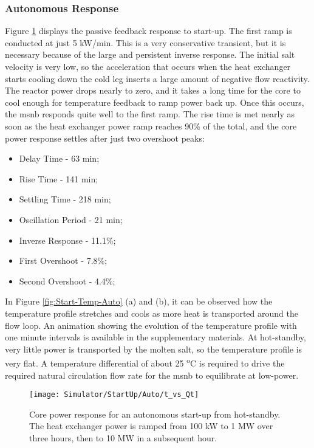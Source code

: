 \subsubsection{Autonomous Response}
Figure \ref{fig:Start-Power-Auto} displays the passive feedback response to start-up. The first ramp is conducted at just 5 kW/min. This is a very conservative transient, but it is necessary because of the large and persistent inverse response. The initial salt velocity is very low, so the acceleration that occurs when the heat exchanger starts cooling down the cold leg inserts a large amount of negative flow reactivity. The reactor power drops nearly to zero, and it takes a long time for the core to cool enough for temperature feedback to ramp power back up. Once this occurs, the \acs{msnb} responds quite well to the first ramp. The rise time is met nearly as soon as the heat exchanger power ramp reaches 90\% of the total, and the core power response settles after just two overshoot peaks:

\begin{itemize}
    \item Delay Time - 63 min;
    \item Rise Time - 141 min;
    \item Settling Time - 218 min;
    \item Oscillation Period - 21 min;
    \item Inverse Response - 11.1\%;
    \item First Overshoot - 7.8\%;
    \item Second Overshoot - 4.4\%;
\end{itemize}

In Figure \ref{fig:Start-Temp-Auto} (a) and (b), it can be observed how the temperature profile stretches and cools as more heat is transported around the flow loop. An animation showing the evolution of the temperature profile with one minute intervals is available in the supplementary materials\footnotemark[2]. At hot-standby, very little power is transported by the molten salt, so the temperature profile is very flat. A temperature differential of about 25 \textsuperscript{o}C is required to drive the required natural circulation flow rate for the \acs{msnb} to equilibrate at low-power.  

\begin{figure}[ht!]
    \centering
    \texttt{[image: Simulator/StartUp/Auto/t\_vs\_Qt]}
    \caption[Autonomous Start-Up Power Response]{Core power response for an autonomous start-up from hot-standby. The heat exchanger power is ramped from 100 kW to 1 MW over three hours, then to 10 MW in a subsequent hour.}
    \label{fig:Start-Power-Auto}
\end{figure}


